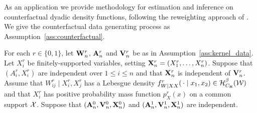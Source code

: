 As an application we provide methodology for estimation and inference
on counterfactual dyadic density functions,
following the reweighting approach of
\citet{dinardo1996distribution}.
We give the counterfactual data
generating process as
Assumption~\ref{ass:counterfactual}.

\begin{assumption}
  \label{ass:counterfactual}

  For each $r \in \{0,1\}$,
  let $\mathbf{W}_n^r$, $\mathbf{A}_n^r$ and $\mathbf{V}_n^r$ be as in
  Assumption~\ref{ass:kernel_data}.
  Let $X_i^r$ be finitely-supported variables,
  setting $\mathbf{X}_n^r = (X_1^r, \ldots, X_n^r)$.
  Suppose that $(A_i^r, X_i^r)$ are
  independent over $1 \leq i \leq n$
  and that $\mathbf{X}_n^r$ is independent of $\mathbf{V}_n^r$.
  Assume that $W_{ij}^r \mid X_i^r, X_j^r$
  has a Lebesgue density
  $f_{W \mid XX}^r(\,\cdot \mid x_1, x_2) \in \mathcal{H}^\beta_{C_\mathrm{H}}(\mathcal{W})$
  and that $X_i^r$ has positive
  probability mass function
  $p_X^r(x)$ on a common support $\mathcal{X}$.
  Suppose that
  $(\mathbf{A}_n^0, \mathbf{V}_n^0, \mathbf{X}_n^0)$
  and $(\mathbf{A}_n^1, \mathbf{V}_n^1, \mathbf{X}_n^1)$
  are independent.

\end{assumption}

